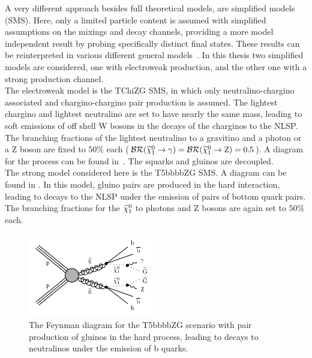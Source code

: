 A very different approach besides full theoretical models, are simplified models (SMS)\cite{SMS}. Here, only a limited particle content is assumed with simplified assumptions on the mixings and decay channels, providing a more model independent result by probing specifically distinct final states. These results can be reinterpreted in various different general models~\cite{SMSReInt}. In this thesis two simplified models are considered, one with electroweak production, and the other one with a strong production channel.\\
The electroweak model is the TChiZG SMS, in which only neutralino-chargino associated and chargino-chargino pair production is assumed. The lightest chargino and lightest neutralino are set to have nearly the same mass, leading to soft emissions of off shell W bosons in the decays of the charginos to the NLSP. The branching fractions of the lightest neutralino to a gravitino and a photon or a Z boson are fixed to $50\%$ each ($\mathcal{BR}(\widetilde{\chi}^{0}_{1}\to\gamma)=\mathcal{BR}(\widetilde{\chi}^{0}_{1}\to\mathrm{Z})=0.5$). A diagram for the process can be found in~. The squarks and gluinos are decoupled.\\
The strong model considered here is the T5bbbbZG SMS. A diagram can be found in . In this model, gluino pairs are produced in the hard interaction, leading to decays to the NLSP under the emission of pairs of bottom quark pairs. The branching fractions for the $\widetilde{\chi}^{0}_{1}$ to photons and Z bosons are again set to $50\%$ each.

\begin{figure}[tbp]
 \centering
 \includegraphics[width=0.49\textwidth]{figures/signal/T5bbbbZG-crop}
 \caption{The Feynman diagram for the T5bbbbZG scenario with pair production of gluinos in the hard process, leading to decays to neutralinos under the emission of b quarks.}
 \label{fig:strongSMS}
\end{figure}


